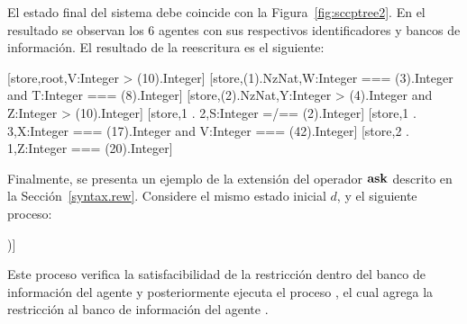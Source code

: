 El estado final del sistema debe coincide con la Figura~\ref{fig:sccptree2}. En el resultado se observan los 6 agentes con sus respectivos identificadores y bancos de informaci\'on. El resultado de la reescritura es el siguiente:

\begin{maude}
{ [store,root,V:Integer > (10).Integer]
  [store,(1).NzNat,W:Integer === (3).Integer 
           and T:Integer === (8).Integer] 
  [store,(2).NzNat,Y:Integer > (4).Integer 
           and Z:Integer > (10).Integer] 
  [store,1 . 2,S:Integer =/== (2).Integer] 
  [store,1 . 3,X:Integer === (17).Integer 
           and V:Integer === (42).Integer] 
  [store,2 . 1,Z:Integer === (20).Integer] }
\end{maude}

Finalmente, se presenta un ejemplo de la extensi\'on del operador ${\bf ask}$ descrito en la Secci\'on~\ref{syntax.rew}. Considere el mismo estado inicial $d$, y el siguiente proceso:

\begin{maude}
[process, root, (ask< 1 >(W:Integer < 15) -> 
   < 2 . 1 >[tell(M:Integer >= 4)])]
\end{maude}

Este proceso verifica la satisfacibilidad de la restricci\'on  dentro del banco de informaci\'on del agente  y posteriormente ejecuta el proceso , el cual agrega la restricci\'on  al banco de informaci\'on del agente .

